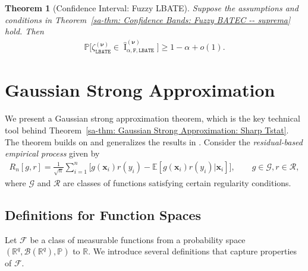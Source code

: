 \documentclass[10pt]{article}
\newtheorem{thm}{Theorem}
\DeclareMathOperator{\CI}{I}
\renewcommand{\P}{\mathbb{P}}
\newcommand{\E}{\mathbb{E}}
\newcommand{\reals}{\mathbb{R}}
\newcommand{\bx}{\mathbf{x}}
\newcommand{\bnu}{\boldsymbol{\nu}}
\newcommand{\B}{\mathcal{B}}
\newcommand{\F}{\mathcal{F}}
\newcommand{\G}{\mathcal{G}}
\newcommand{\R}{\mathcal{R}}
\begin{document}
\begin{thm}[Confidence Interval: Fuzzy LBATE]\label{sa-thm: Confidence Intervals: Fuzzy LBATE}
    Suppose the assumptions and conditions in Theorem~\ref{sa-thm: Confidence Bands: Fuzzy BATEC -- suprema} hold. Then
    \begin{align*}
            \P\Big[\zeta_{\mathtt{LBATE}}^{(\bnu)} \in \widehat{\CI}_{\alpha,\mathtt{F,LBATE}}^{(\bnu)} \Big] \geq 1 - \alpha + o(1).
    \end{align*}
\end{thm}



\section{Gaussian Strong Approximation}\label{sa-sec: Gaussian Strong Approximation}

We present a Gaussian strong approximation theorem, which is the key technical tool behind Theorem~\ref{sa-thm: Gaussian Strong Approximation: Sharp Tstat}. The theorem builds on and generalizes the results in \cite{Cattaneo-Yu_2025_AOS}. Consider the \emph{residual-based empirical process} given by
\begin{align*}
    R_n[g,r] = \frac{1}{\sqrt{n}} \sum_{i = 1}^n \Big[g(\bx_i) r(y_i) - \E[g(\bx_i) r(y_i)|\bx_i] \Big], \qquad g \in \G, r \in \R,
\end{align*}
where $\G$ and $\R$ are classes of functions satisfying certain regularity conditions.

\subsection{Definitions for Function Spaces}

Let $\F$ be a class of measurable functions from a probability space $(\reals^q, \B(\reals^q), \P)$ to $\reals$. We introduce several definitions that capture properties of $\F$.
\end{document}
